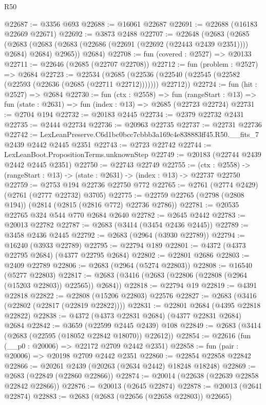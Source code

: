 \begin{lexlean}{R50}
\begin{coremodule}
@22687 := @3356 @693
@22688 := @16061 @22687
@22691 := @22688 (@16183 @22669 @22671)
@22692 := @3873 @2488
@22707 := @22648
    (@2683
      (@2685
        (@2683 (@2683 (@2683 (@22686 (@22691 (@22692 (@22443 @2439 @2351)))) @2684) @2684) @2965))
      @2684)
@22708 := fun (covered : @2527) => @20133
@22711 := @22646 (@2685 (@22707 @22708))
@22712 := fun (problem : @2527) => @2684
@22723 := @22534
    (@2685 (@22536 (@22540 (@22545 (@22582 (@22593 (@22636 (@2685 (@22711 @22712))))))) @22712))
@22724 := fun (hit : @2527) => @2684
@22730 := fun (ctx : @2558) =>
  fun (rangeStart : @13) => fun (state : @2631) => fun (index : @13) => @2685 (@22723 @22724)
@22731 := @2704 @194
@22732 := @20183 @2445
@22734 := @2379 @22732 @2431
@22735 := @2444 @22734
@22736 := @20963 @22735
@22737 := @22731 @22736
@22742 := LexLeanPreserve.C6d1bc0bcc7cbbb3a169c4e838883ff45.R50.__fits_7 @2439 @2442 @2445 @2351
@22743 := @2723 @22742
@22744 := LexLeanBoot.PropositionTerms.unknownStep
@22749 := @20183 (@22744 @2439 @2442 @2445 @2351)
@22750 := @22743 @22749
@22755 := (ctx : @2558) -> (rangeStart : @13) -> (state : @2631) -> (index : @13) -> @22737 @22750
@22759 := @2753 @194 @22736 @22750 @772
@22765 := @2761 (@2774 @2429) (@2761 (@2777 @22732) @3705)
@22775 := @22759 @22765 (@2798 (@2808 @194)) (@2814 (@2815 (@2816 @772) @22736 @2786))
@22781 := @20535 @22765 @324 @544 @770 @2684 @2640
@22782 := @2645 @2442
@22783 := @20013 @22782
@22787 := @2683 (@3414 (@3454 @2436 @2445))
@22789 := @3458 @2436 @2445
@22792 := @2683 (@2964 (@3930 @22789))
@22794 := @16240 (@3933 @22789)
@22795 := @22794 @189
@22801 := @4372 (@4373 @22795 @2684) (@4377 @22795 @2684)
@22802 := @22801 @2686
@22803 := @2409 @22789
@22806 := @2683 (@2964 (@5274 @22803))
@22808 := @16540 (@5277 @22803)
@22817 := @2683 (@3416 (@2683 (@22806 (@22808 (@2964 (@15203 @22803)) @22565)) @2684))
@22818 := @22794 @19
@22819 := @4391 @22818
@22822 := @22808 (@15206 @22803) @22576
@22827 := @2683 (@3416 (@22802 (@22817 (@22819 @22822))))
@22831 := @22801 @2684 (@4395 @22818 @22822)
@22838 := @4372 (@4373 @22831 @2684) (@4377 @22831 @2684) @2684
@22842 := @3659 (@22599 @2445 @2439) @108
@22849 := @2683 (@3414 (@2683 (@22595 (@18052 @22842 @18070)) @22612))
@22854 := @22616 (fun (__p0 : @20006) => @22172 @2709 @2442 @2351)
@22858 := fun (pair : @20006) => @20198 @2709 @2442 @2351
@22860 := @22854 @22858 @22842
@22866 := @20261 @2439 (@20263 (@2634 @2442) @18248 @18248)
@22869 := @2683 (@22849 (@22860 @22866))
@22874 := @20014 (@22638 (@22639 @22858 @22842 @22866))
@22876 := @20013 (@2645 @22874)
@22878 := @20013 (@2641 @22874)
@22883 := @2683 (@2683 (@22656 (@22658 @22803)) @22665)

\end{coremodule}
\end{lexlean}
